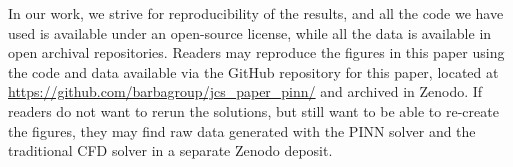 
In our work, we strive for reproducibility of the results, and all the code we have used is available under an open-source license, while all the data is available in open archival repositories.
Readers may reproduce the figures in this paper using the code and data available via the GitHub repository for this paper, located at \url{https://github.com/barbagroup/jcs_paper_pinn/} and archived in Zenodo. 
If readers do not want to rerun the solutions, but still want to be able to re-create the figures, they may find raw data generated with the PINN solver and the traditional CFD solver in a separate Zenodo deposit.